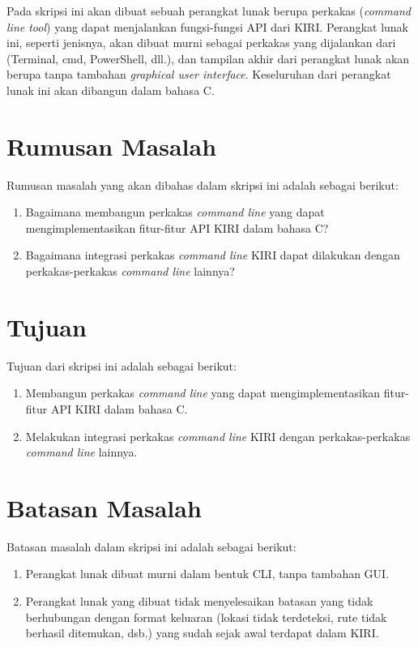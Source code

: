 Pada skripsi ini akan dibuat sebuah perangkat lunak berupa perkakas \cl (\textit{command line tool}) yang dapat menjalankan fungsi-fungsi API dari KIRI. Perangkat lunak ini, seperti jenisnya, akan dibuat murni sebagai perkakas yang dijalankan dari \cl (Terminal, cmd, PowerShell, dll.), dan tampilan akhir dari perangkat lunak akan berupa \cli tanpa tambahan \textit{graphical user interface}. Keseluruhan dari perangkat lunak ini akan dibangun dalam bahasa C.
\vspace{-0.5em} %
\section{Rumusan Masalah}
\label{sec:rumusan}
Rumusan masalah yang akan dibahas dalam skripsi ini adalah sebagai berikut:
\begin{enumerate}
	\item Bagaimana membangun perkakas \textit{command line} yang dapat mengimplementasikan fitur-fitur API KIRI dalam bahasa C?
	\item Bagaimana integrasi perkakas \textit{command line} KIRI dapat dilakukan dengan perkakas-perkakas \textit{command line} lainnya?
\end{enumerate}
\vspace{-0.5em} %
\section{Tujuan}
\label{sec:tujuan}
Tujuan dari skripsi ini adalah sebagai berikut:
\begin{enumerate}
	\item Membangun perkakas \textit{command line} yang dapat mengimplementasikan fitur-fitur API KIRI dalam bahasa C.
	\item Melakukan integrasi perkakas \textit{command line} KIRI dengan perkakas-perkakas \textit{command line} lainnya.
\end{enumerate}
\vspace{-0.5em} %
\section{Batasan Masalah}
\label{sec:batasan}
Batasan masalah dalam skripsi ini adalah sebagai berikut:
\begin{enumerate}
	\item Perangkat lunak dibuat murni dalam bentuk CLI, tanpa tambahan GUI.
	\item Perangkat lunak yang dibuat tidak menyelesaikan batasan yang tidak berhubungan dengan format keluaran (lokasi tidak terdeteksi, rute tidak berhasil ditemukan, dsb.) yang sudah sejak awal terdapat dalam KIRI.
\end{enumerate}

